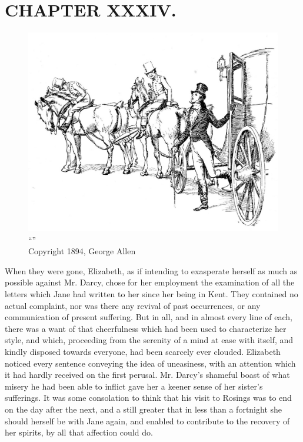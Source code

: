 \chapter{CHAPTER XXXIV.}

\begin{figure}[htbp]
    \centering
    \includegraphics[width=\textwidth]{illustrations/i_031.jpg}
    \caption{“”\\ Copyright 1894, George Allen}
    \label{fig:image}
\end{figure}


When they were gone, Elizabeth, as if intending to exasperate herself as much as possible against Mr. Darcy, chose for her employment the examination of all the letters which Jane had written to her since her being in Kent. They contained no actual complaint, nor was there any revival of past occurrences, or any communication of present suffering. But in all, and in almost every line of each, there was a want of that cheerfulness which had been used to characterize her style, and which, proceeding from the serenity of a mind at ease with itself, and kindly disposed towards everyone, had been scarcely ever clouded. Elizabeth noticed every sentence conveying the idea of uneasiness, with an attention which it had hardly received on the first perusal. Mr. Darcy's shameful boast of what misery he had been able to inflict gave her a keener sense of her sister's sufferings. It was some consolation to think that his visit to Rosings was to end on the day after the next, and a still greater that in less than a fortnight she should herself be with Jane again, and enabled to contribute to the recovery of her spirits, by all that affection could do.

